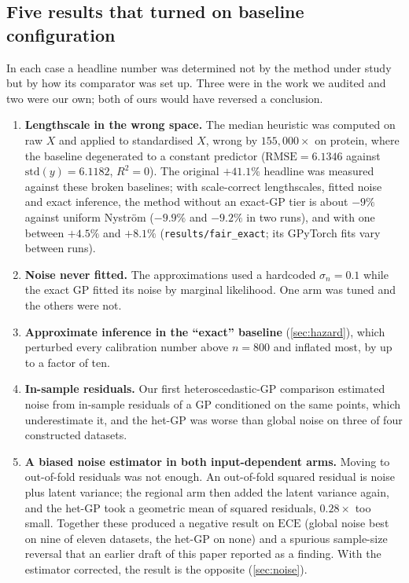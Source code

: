 \documentclass[11pt]{article}
\newcommand{\ece}{\mathrm{ECE}}
\begin{document}
\subsection{Five results that turned on baseline configuration}

In each case a headline number was determined not by the method under study but by how
its comparator was set up. Three were in the work we audited and two were our own;
both of ours would have reversed a conclusion.

\begin{enumerate}
\item \textbf{Lengthscale in the wrong space.} The median heuristic was computed on
raw $X$ and applied to standardised $X$, wrong by $155{,}000\times$ on protein,
where the baseline degenerated to a constant predictor ($\mathrm{RMSE} = 6.1346$
against $\mathrm{std}(y) = 6.1182$, $R^2 = 0$). The original $+41.1\%$ headline was
measured against these broken baselines; with scale-correct lengthscales, fitted
noise and exact inference, the method without an exact-GP tier is about $-9\%$
against uniform Nystr\"om ($-9.9\%$ and $-9.2\%$ in two runs), and with one between
$+4.5\%$ and $+8.1\%$ (\texttt{results/fair\_exact}; its GPyTorch fits vary between runs).
\item \textbf{Noise never fitted.} The approximations used a hardcoded
$\sigma_n = 0.1$ while the exact GP fitted its noise by marginal likelihood. One arm
was tuned and the others were not.
\item \textbf{Approximate inference in the ``exact'' baseline} (\cref{sec:hazard}),
which perturbed every calibration number above $n=800$ and inflated most, by up to
a factor of ten.
\item \textbf{In-sample residuals.} Our first heteroscedastic-GP comparison estimated
noise from in-sample residuals of a GP conditioned on the same points, which
underestimate it, and the het-GP was worse than global noise on three of four
constructed datasets.
\item \textbf{A biased noise estimator in both input-dependent arms.} Moving to
out-of-fold residuals was not enough. An out-of-fold squared residual is noise plus
latent variance; the regional arm then added the latent variance again, and the
het-GP took a geometric mean of squared residuals, $0.28\times$ too small. Together
these produced a negative result on $\ece$ (global noise best on nine of eleven
datasets, the het-GP on none) and a spurious sample-size reversal that an earlier
draft of this paper reported as a finding. With the estimator corrected, the result
is the opposite (\cref{sec:noise}).
\end{enumerate}
\end{document}
